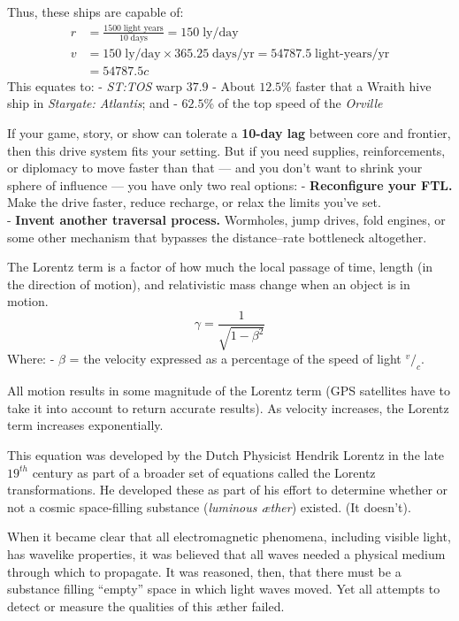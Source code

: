 \documentclass[
  letterpaper,
]{book}
\begin{document}
Thus, these ships are capable of: \[
\begin{align}
r &= \frac{1500\;\text{light years}}{10\;\text{days}} = 150\;\text{ly/day} \\[0.5em]
v &= 150\;\text{ly/day} \times 365.25\;\text{days/yr} = 54787.5\;\text{light-years/yr} \\[0.5em]
&= 54787.5c
\end{align}
\] This equates to: - \emph{ST:TOS} warp \(37.9\) - About \(12.5\)\%
faster that a Wraith hive ship in \emph{Stargate: Atlantis}; and -
\(62.5\)\% of the top speed of the \emph{Orville}

If your game, story, or show can tolerate a \textbf{10-day lag} between
core and frontier, then this drive system fits your setting. But if you
need supplies, reinforcements, or diplomacy to move faster than that ---
and you don't want to shrink your sphere of influence --- you have only
two real options: - \textbf{Reconfigure your FTL.} Make the drive
faster, reduce recharge, or relax the limits you've set.\\
- \textbf{Invent another traversal process.} Wormholes, jump drives,
fold engines, or some other mechanism that bypasses the distance--rate
bottleneck altogether.

The Lorentz term is a factor of how much the local passage of time,
length (in the direction of motion), and relativistic mass change when
an object is in motion. \[
\gamma = \frac{1}{\sqrt{1-\beta^2}}
\] Where: - \(\beta\) = the velocity expressed as a percentage of the
speed of light \(^v/_c\).

All motion results in some magnitude of the Lorentz term (GPS satellites
have to take it into account to return accurate results). As velocity
increases, the Lorentz term increases exponentially.

This equation was developed by the Dutch Physicist Hendrik Lorentz in
the late \(19^{th}\) century as part of a broader set of equations
called the Lorentz transformations. He developed these as part of his
effort to determine whether or not a cosmic space-filling substance
(\emph{luminous æther}) existed. (It doesn't).

When it became clear that all electromagnetic phenomena, including
visible light, has wavelike properties, it was believed that all waves
needed a physical medium through which to propagate. It was reasoned,
then, that there must be a substance filling ``empty'' space in which
light waves moved. Yet all attempts to detect or measure the qualities
of this æther failed.
\end{document}
